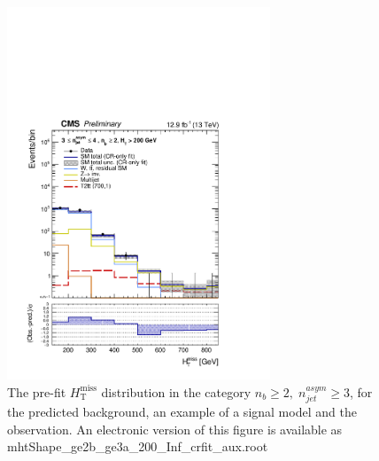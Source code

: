 \clearpage
\begin{figure}[tbhp]
    \caption{ 
    The pre-fit $H_{\mathrm{T}}^{\mathrm{miss}}$ distribution in the category $n_{b}\geq 2, \; n_{jet}^{asym} \geq 3$, 
    for the predicted background, an example of a signal model and the observation.
    An electronic version of this figure is available as mhtShape\_ge2b\_ge3a\_200\_Inf\_crfit\_aux.root
    \label{fig:mhtShape_ge2b_ge3a_crfit} }
  \begin{center}
  \includegraphics[width=0.7\textwidth]{mhtShape_ge2b_ge3a_200_Inf_crfit_aux}
  \end{center}
\end{figure}


